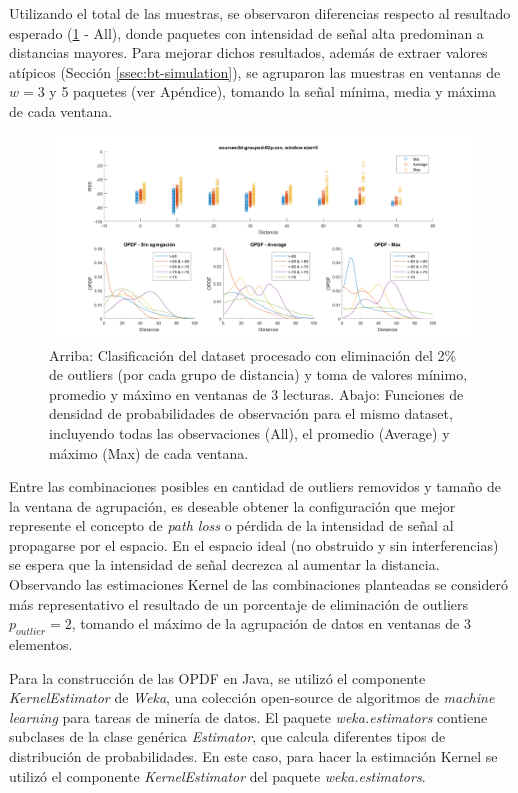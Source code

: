 Utilizando el total de las muestras, se observaron diferencias respecto al resultado esperado (\ref{fig:opdf-grouped} - All), donde paquetes con intensidad de señal alta predominan a distancias mayores. Para mejorar dichos resultados, además de extraer valores atípicos (Sección \ref{ssec:bt-simulation}), se agruparon las muestras en ventanas de $w=3$ y 5 paquetes (ver Apéndice), tomando la señal mínima, media y máxima de cada ventana. 

\begin{figure}[!htp]
	\centering
	\includegraphics[width=\textwidth]{images/all_g-percentil=2-w=3.png}
	\captionsetup{width=0.9\textwidth}
	\caption{Arriba: Clasificación del dataset procesado con eliminación del 2\% de outliers (por cada grupo de distancia) y toma de valores mínimo, promedio y máximo en ventanas de 3 lecturas. Abajo: Funciones de densidad de probabilidades de observación para el mismo dataset, incluyendo todas las observaciones (All), el promedio (Average) y máximo (Max) de cada ventana.}
    \label{fig:opdf-grouped}
\end{figure}
 
 Entre las combinaciones posibles en cantidad de outliers removidos y tamaño de la ventana de agrupación, es deseable obtener la configuración que mejor represente el concepto de \textit{path loss} o pérdida de la intensidad de señal al propagarse por el espacio. En el espacio ideal (no obstruido y sin interferencias) se espera que la intensidad de señal decrezca al aumentar la distancia. Observando las estimaciones Kernel de las combinaciones planteadas se consideró más representativo el resultado de un porcentaje de eliminación de outliers $p_{outlier}=2$, tomando el máximo de  la agrupación de datos en ventanas de 3 elementos.

 Para la construcción de las OPDF en Java, se utilizó el componente \textit{KernelEstimator} de \textit{Weka}, una colección open-source de algoritmos de \textit{machine learning} para tareas de minería de datos. El paquete \textit{weka.estimators} contiene subclases de la clase genérica \textit{Estimator}, que calcula diferentes tipos de distribución de probabilidades. En este caso, para hacer la estimación Kernel se utilizó el componente \textit{KernelEstimator} del paquete \textit{weka.estimators}. 
 
